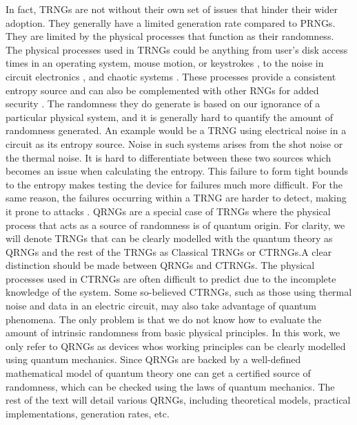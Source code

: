 \documentclass[]{interact}
\theoremstyle{plain}%
\theoremstyle{definition}
\theoremstyle{remark}
\begin{document}
 In fact, TRNGs are not without their own set of issues that hinder their wider adoption. They generally have a limited generation rate compared to PRNGs. They are limited by the physical processes that function as their randomness. The physical processes used in TRNGs could be anything from user's disk access times in an operating system, mouse motion, or keystrokes \cite{gutterman2006analysis}, to the noise in circuit electronics \cite{hamburg2012analysis}, and chaotic systems \cite{stojanovski2001chaos}. These processes provide a consistent entropy source and can also be complemented with other RNGs for added security \cite{becker2014stealthy}. The randomness they do generate is based on our ignorance of a particular physical system, and it is generally hard to quantify the amount of randomness generated. An example would be a TRNG using electrical noise in a circuit as its entropy source. Noise in such systems arises from the shot noise or the thermal noise. It is hard to differentiate between these two sources \cite{PhysRevB.47.16427} which becomes an issue when calculating the entropy. This failure to form tight bounds to the entropy makes testing the device for failures much more difficult. For the same reason, the failures occurring within a TRNG are harder to detect, making it prone to attacks \cite{killmann2011proposal}. QRNGs are a special case of TRNGs where the physical process that acts as a source of randomness is of quantum origin. For clarity, we will denote TRNGs that 
 can be clearly modelled with the quantum theory as QRNGs and the rest of the TRNGs as Classical TRNGs or CTRNGs.A clear distinction should be made between QRNGs and CTRNGs. The physical processes used in CTRNGs are often difficult to predict due to the incomplete knowledge of the system. Some so-believed CTRNGs, such as those using thermal noise and data in an electric circuit, may also take advantage of quantum phenomena. The only problem is that we do not know how to evaluate the amount of intrinsic randomness from basic physical principles. In this work, we only refer to QRNGs as devices whos working principles can be clearly modelled using quantum mechanics.  Since QRNGs are backed by a well-defined mathematical model of quantum theory one can get a certified source of randomness, which can be checked using the laws of quantum mechanics. The rest of the text will detail various QRNGs, including theoretical models, practical implementations, generation rates, etc.
 
    
    
\end{document}
